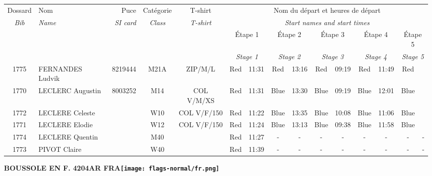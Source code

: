 \documentclass{report}
\begin{document}
  \begin{longtable}{|c|l|r|c|c|*{5}{cc|}}
    Dossard & Nom  & Puce    & Catégorie & T-shirt & \multicolumn{10}{c|}{Nom du départ et heures de départ} \\
    \itshape Bib     & \itshape Name & \itshape SI card & \itshape Class  & \itshape  T-shirt  & \multicolumn{10}{c|}{\itshape Start names and start times} \\
    \hline
    & & & & & \multicolumn{2}{c|}{Étape 1} & \multicolumn{2}{c|}{Étape 2} & \multicolumn{2}{c|}{Étape 3} & \multicolumn{2}{c|}{Étape 4} & \multicolumn{2}{c|}{Étape 5} \\
    & & & & & \multicolumn{2}{c|}{\itshape Stage 1} & \multicolumn{2}{c|}{\itshape Stage 2} & \multicolumn{2}{c|}{\itshape Stage 3} & \multicolumn{2}{c|}{\itshape Stage 4} & \multicolumn{2}{c|}{\itshape Stage 5} \\
    \hline
    1775 & FERNANDES Ludvik & 8219444 & M21A & ZIP/M/L & Red & 11:31 & Red & 13:16 & Red & 09:19 & Red & 11:49 & Red &  \\
    1770 & LECLERC Augustin & 8003252 & M14 & COL V/M/XS & Red & 11:31 & Blue & 13:30 & Blue & 09:19 & Blue & 12:01 & Blue &  \\
    1772 & LECLERE Celeste &  & W10 & COL V/F/150 & Red & 11:22 & Blue & 13:35 & Blue & 10:08 & Blue & 11:06 & Blue &  \\
    1771 & LECLERE Elodie &  & W12 & COL V/F/150 & Red & 11:24 & Blue & 13:13 & Blue & 09:38 & Blue & 11:58 & Blue &  \\
    1774 & LECLERE Quentin &  & M40 &   & Red & 11:27 & - &  - & - &  - & - &  - & - &  -\\
    1773 & PIVOT Claire &  & W40 &   & Red & 11:39 & - &  - & - &  - & - &  - & - &  -\\
  \end{longtable}
\newpage
  \Huge \centering \bfseries BOUSSOLE EN F. 4204AR FRA\normalfont \footnotesize \sffamily \hfill \texttt{[image: flags-normal/fr.png]} \newline 
\end{document}
